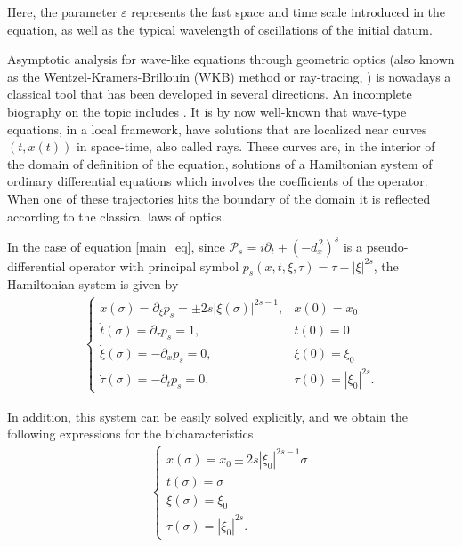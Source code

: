 \documentclass[10pt]{article}
\newcommand{\ffl}[2]{(-d_x^{\,2})^{#1}#2}
\newcommand{\PP}{\mathcal{P}}
\begin{document}
Here, the parameter $\varepsilon$ represents the fast space and time scale introduced in the equation, as well as the typical wavelength of oscillations of the initial datum. 

Asymptotic analysis for wave-like equations through geometric optics (also known as the Wentzel-Kramers-Brillouin (WKB) method or ray-tracing, \cite{brillouin1926mecanique,kramers1926wellenmechanik,spigler1997survey,wentzel1926verallgemeinerung}) is nowadays a classical tool that has been developed in several directions. An incomplete biography on the topic includes \cite{liu2010recovery,liu2013error,liu2015sobolev}. It is by now well-known that wave-type equations, in a local framework, have solutions that are localized near curves $(t,x(t))$ in space-time, also called rays. These curves are, in the interior of the domain of definition of the equation, solutions of a Hamiltonian system of ordinary differential equations which involves the coefficients of the operator. When one of these trajectories hits the boundary of the domain it is reflected according to the classical laws of optics.

In the case of equation \eqref{main_eq}, since $\PP_s=i\partial_t+\ffl{s}{}$ is a pseudo-differential operator with principal symbol $p_s(x,t,\xi,\tau) = \tau - |\xi|^{2s}$, the Hamiltonian system is given by
\begin{align*}%
	\begin{cases}
		\dot{x}(\sigma) = \partial_\xi p_s = \pm 2s|\xi(\sigma)|^{2s-1}, & x(0)=x_0
		\\
		\dot{t}(\sigma) = \partial_\tau p_s = 1, & t(0)=0
		\\
		\dot{\xi}(\sigma) = -\partial_x p_s = 0, & \xi(0)=\xi_0
		\\
		\dot{\tau}(\sigma) = -\partial_t p_s =0, & \tau(0)=|\xi_0|^{2s}.
	\end{cases}
\end{align*}

In addition, this system can be easily solved explicitly, and we obtain the following expressions for the bicharacteristics
\begin{align*}
	\begin{cases}
		x(\sigma) = x_0 \pm 2s|\xi_0|^{2s-1}\sigma
		\\
		t(\sigma) = \sigma 
		\\
		\xi(\sigma) = \xi_0
		\\
		\tau(\sigma) = |\xi_0|^{2s}.
	\end{cases}
\end{align*}
\end{document}
